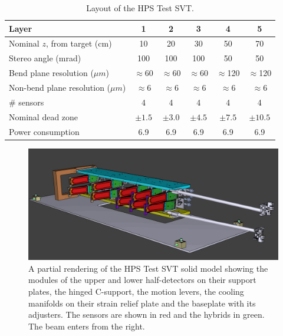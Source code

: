 \begin{table}[h]
\begin{center}
\begin{tabular}{lccccc}   
\hline \hline 
    Layer & 1 & 2 & 3 & 4 & 5 \\      
\hline
    Nominal $z$, from target (cm)  & 10 & 20 & 30 & 50 & 70  \\ 
    Stereo angle (mrad)  & 100 & 100 & 100 & 50 & 50 \\ 
    Bend plane resolution ($\mu m$)  & $\approx$60 & $\approx$60 & $\approx$60 & $\approx$120 & $\approx$120  \\ 
    Non-bend plane resolution ($\mu m$)  & $\approx$6 & $\approx$6 & $\approx$6 & $\approx$6 & $\approx$6  \\ 
    \# sensors  & 4 & 4 & 4 & 4 & 4  \\ 
    Nominal dead zone  & $\pm1.5$  & $\pm3.0$  & $\pm4.5$  & $\pm7.5$  & $\pm10.5$  \\ 
    Power consumption & 6.9 & 6.9 & 6.9 & 6.9 & 6.9 \\
\hline \hline
\end{tabular}
\caption[]{Layout of the HPS Test SVT. }
\label{tab:trk} 
\end{center}
\end{table}

\begin{figure}[ht]
    \includegraphics[width=\textwidth]{test2012/HPS_nocables_nowires}
\caption{\small{A partial rendering of the HPS Test SVT solid model showing the modules of the upper and lower half-detectors on their support plates, the hinged C-support, the motion levers, the cooling manifolds on their strain relief plate and the baseplate with its adjusters.  The sensors are shown in red and the hybrids in green. The beam enters from the right.} }
\label{fig:tracker_model}
\end{figure}

